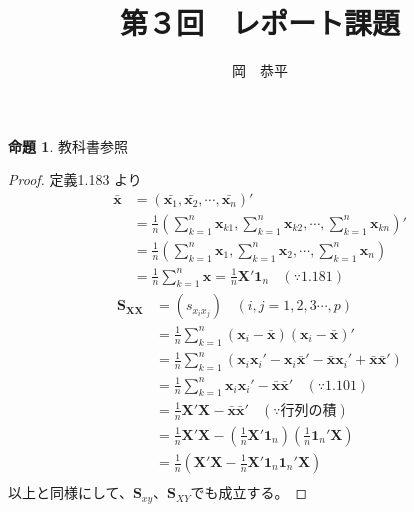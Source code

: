 \documentclass[dvipdfmx,10pt, a4j]{jarticle}
\title{第３回　レポート課題}
\author{岡　恭平}
\theoremstyle{definition}
\newtheorem{proposition}[theorem]{命題}
\begin{document}
\maketitle

\setcounter{section}{1}
\setcounter{theorem}{49}

\begin{proposition}
教科書参照
\end{proposition}

\begin{proof}
  定義1.183 より
\begin{align*}
    \bar{\bm{x}} &=(\bar{\bm{x}_{1}},\bar{\bm{x}_{2}},{\cdots},\bar{\bm{x}_{n}})'
    \\
    &= \frac{1}{n}(\sum_{k=1}^{n}{\bm{x}_{k1}},\sum_{k=1}^{n}{\bm{x}_{k2}},{\cdots},\sum_{k=1}^{n}{\bm{x}_{kn}})'
    \\
    &= \frac{1}{n}(\sum_{k=1}^{n}{\bm{x}_{1}},\sum_{k=1}^{n}{\bm{x}_{2}},{\cdots},\sum_{k=1}^{n}{\bm{x}_{n }})
    \\
    &= \frac{1}{n}{\sum_{k=1}^{n}{\bm{x}}} = \frac{1}{n}\bm{X}'\bm{1}_{n}~~~~(\because 1.181)
  \end{align*}
  \begin{align*}
    \bm{{S}_{XX}}&=({s}_{{x}_{i}{x}_{j}})~~~~({i},{j}=1,2,3\cdots,{p})
    \\
    &=\frac{1}{n}\sum_{k=1}^{n}(\bm{x}_{i}-{\bar{\bm{x}}})(\bm{x}_{i}-{\bar{\bm{x}}})'
    \\
    &=\frac{1}{n}\sum_{k=1}^{n}(
      \bm{x}_{i}\bm{x}_{i}'
      -\bm{x}_{i}{\bar{\bm{x}}}'
      -{\bar{\bm{x}}}\bm{x}_{i}'
      +{\bar{\bm{x}}}{\bar{\bm{x}}'}
      )
    \\
    &=\frac{1}{n}\sum_{k=1}^{n}\bm{x}_{i}\bm{x}_{i}'-{\bar{\bm{x}}}{\bar{\bm{x}}}'~~~~(\because 1.101)
    \\
    &=\frac{1}{n}\bm{X}'\bm{X}-{\bar{\bm{x}}}{\bar{\bm{x}}}'~~~~(\because 行列の積)
    \\
    &=\frac{1}{n}\bm{X}'\bm{X}- (\frac{1}{n}\bm{X}'\bm{1}_{n})(\frac{1}{n}\bm{1}_{n}'\bm{X})
    \\
    &=\frac{1}{n}(\bm{X}'\bm{X}-{\frac{1}{n}\bm{X}'\bm{1}_{n}\bm{1}_{n}'\bm{X}})
    \\
  \end{align*}
  以上と同様にして、$\bm{S}_{xy}、\bm{S}_{XY}$でも成立する。
\end{proof}
\end{document}

